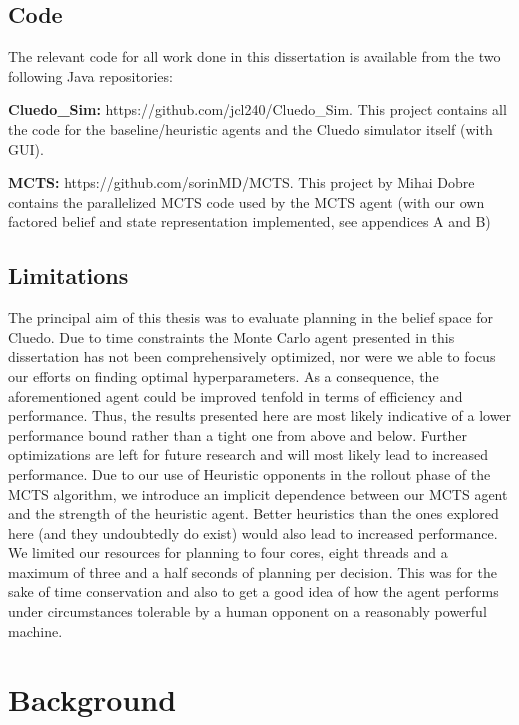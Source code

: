 \documentclass[msc, deptreport, ai, romanprepages]{infthesis}
\begin{document}
\section{Code}
The relevant code for all work done in this dissertation is available from the two following Java repositories:
\begin{description}
\item \textbf{Cluedo\_Sim:} https://github.com/jcl240/Cluedo\_Sim. This project contains all the code for the baseline/heuristic agents and the Cluedo simulator itself (with GUI). 
\item \textbf{MCTS:} https://github.com/sorinMD/MCTS. This project by Mihai Dobre contains the parallelized MCTS code used by the MCTS agent (with our own factored belief and state representation implemented, see appendices A and B)
\end{description}

\section{Limitations}
The principal aim of this thesis was to evaluate planning in the belief space for Cluedo. Due to time constraints the Monte Carlo agent presented in this dissertation has not been comprehensively optimized, nor were we able to focus our efforts on finding optimal hyperparameters. As a consequence, the aforementioned agent could be improved tenfold in terms of efficiency and performance. Thus, the results presented here are most likely indicative of a lower performance bound rather than a tight one from above and below. Further optimizations are left for future research and will most likely lead to increased performance. Due to our use of Heuristic opponents in the rollout phase of the MCTS algorithm, we introduce an implicit dependence between our MCTS agent and the strength of the heuristic agent. Better heuristics than the ones explored here (and they undoubtedly do exist) would also lead to increased performance. We limited our resources for planning to four cores, eight threads and a maximum of three and a half seconds of planning per decision. This was for the sake of time conservation and also to get a good idea of how the agent performs under circumstances tolerable by a human opponent on a reasonably powerful machine. 

\chapter{Background}
\end{document}
